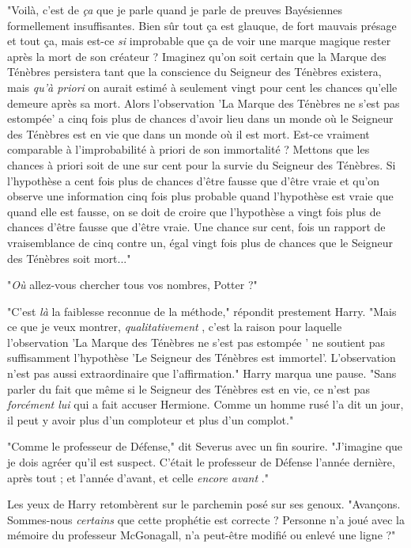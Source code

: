 "Voilà, c'est de \emph{ça}  que je parle quand je parle de preuves Bayésiennes formellement insuffisantes. Bien sûr tout ça est glauque, de fort mauvais présage et tout ça, mais est-ce \emph{si}  improbable que ça de voir une marque magique rester après la mort de son créateur ? Imaginez qu'on soit certain que la Marque des Ténèbres persistera tant que la conscience du Seigneur des Ténèbres existera, mais \emph{qu'à priori}  on aurait estimé à seulement vingt pour cent les chances qu'elle demeure après sa mort. Alors l'observation 'La Marque des Ténèbres ne s'est pas estompée' a cinq fois plus de chances d'avoir lieu dans un monde où le Seigneur des Ténèbres est en vie que dans un monde où il est mort. Est-ce vraiment comparable à l'improbabilité à priori de son immortalité ? Mettons que les chances à priori soit de une sur cent pour la survie du Seigneur des Ténèbres. Si l'hypothèse a cent fois plus de chances d'être fausse que d'être vraie et qu'on observe une information cinq fois plus probable quand l'hypothèse est vraie que quand elle est fausse, on se doit de croire que l'hypothèse a vingt fois plus de chances d'être fausse que d'être vraie. Une chance sur cent, fois un rapport de vraisemblance de cinq contre un, égal vingt fois plus de chances que le Seigneur des Ténèbres soit mort..."

"\emph{Où}  allez-vous chercher tous vos nombres, Potter ?"

"C'est \emph{là}  la faiblesse reconnue de la méthode," répondit prestement Harry. "Mais ce que je veux montrer, \emph{qualitativement} , c'est la raison pour laquelle l'observation 'La Marque des Ténèbres ne s'est pas estompée ' ne soutient pas suffisamment l'hypothèse 'Le Seigneur des Ténèbres est immortel'. L'observation n'est pas aussi extraordinaire que l'affirmation." Harry marqua une pause. "Sans parler du fait que même si le Seigneur des Ténèbres est en vie, ce n'est pas \emph{forcément lui}  qui a fait accuser Hermione. Comme un homme rusé l'a dit un jour, il peut y avoir plus d'un comploteur et plus d'un complot."

"Comme le professeur de Défense," dit Severus avec un fin sourire. "J'imagine que je dois agréer qu'il est suspect. C'était le professeur de Défense l'année dernière, après tout ; et l'année d'avant, et celle \emph{encore avant} ."

Les yeux de Harry retombèrent sur le parchemin posé sur ses genoux. "Avançons. Sommes-nous \emph{certains}  que cette prophétie est correcte ? Personne n'a joué avec la mémoire du professeur McGonagall, n'a peut-être modifié ou enlevé une ligne ?"

